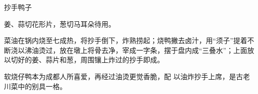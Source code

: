 \begin{recipe}{抄手鸭子}

\ingredients


\cooking

\step 姜、蒜切花形片，葱切马耳朵待用。

\step 菜油在锅内烧至七成热，将抄手倒下，炸熟捞起；烧鸭撇去卤汁，用“须子”提着不断浇以沸油烫过，放在墩上将骨去净，宰成一字条，摆于盘内成“三叠水”；上面放以切好的姜、蒜片和葱，周围镶上炸过的抄手即成。

\notes

软烧仔鸭本为成都人所喜爱，再经过油烫更觉香脆，配 以油炸抄手上席，是古老川菜中的别具一格。

\end{recipe}

